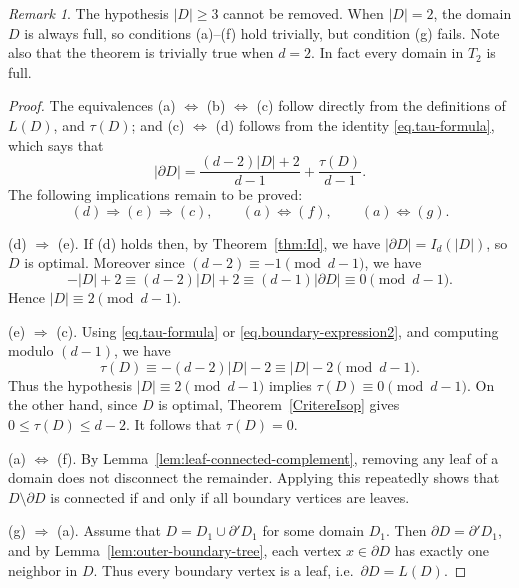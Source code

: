 \documentclass[a4paper, 11pt]{article}
\numberwithin{equation}{section}
\theoremstyle{definition}
\theoremstyle{remark}
\newtheorem{remark}[theorem]{Remark}
\begin{document}
\begin{remark}
The hypothesis $|D|\ge 3$ cannot be removed.  
When $|D|=2$, the domain $D$ is always full, so conditions (a)--(f) hold trivially, but condition (g) fails.
Note also that the theorem is trivially true when $d=2$. In fact every domain  in $T_2$ is full. 
\end{remark}

\medskip

\begin{proof} 
The equivalences (a) $\Leftrightarrow$ (b) $\Leftrightarrow$ (c) follow directly from the definitions of $L(D)$, and $\tau(D)$; and 
(c)  $\Leftrightarrow$ (d) follows from the identity \eqref{eq.tau-formula}, which says that 
\begin{equation}\label{eq.boundary-expression2}
    |\partial D| = \frac{(d-2)|D|+2}{d-1} + \frac{\tau(D)}{d-1}.
\end{equation}
The following implications remain to be proved:
$$
 (d)   \Rightarrow  (e)  \Rightarrow  (c),   \qquad    (a) \Leftrightarrow  (f) ,      \qquad      (a)\Leftrightarrow  (g).
$$

\smallskip

(d) $\Rightarrow$ (e).  
If (d) holds then, by Theorem~\ref{thm:Id}, we have $|\partial D| = I_d(|D|)$, so $D$ is optimal.  
Moreover  since  $(d-2)\equiv -1 \pmod{d-1}$, we have
$$
   -|D|+2 \equiv (d-2)|D|+2 \equiv (d-1) |\partial D|  \equiv 0 \pmod{d-1}.
$$
Hence $|D| \equiv 2 \pmod{d-1}$.


\smallskip

(e) $\Rightarrow$ (c).  
Using \eqref{eq.tau-formula} or \eqref{eq.boundary-expression2}, and computing modulo $(d-1)$, we have
\[
\tau(D)\equiv -(d-2)|D|-2 \equiv |D|-2 \pmod{d-1}.
\]
Thus the hypothesis $|D| \equiv 2 \pmod{d-1}$ implies $\tau(D)\equiv 0\pmod{d-1}$.  On the other hand, since $D$  is optimal, Theorem~\ref{CritereIsop} gives $0\le \tau(D)\le d-2$. It follows that $\tau(D)=0$.

\smallskip

(a) $\Leftrightarrow$ (f).  
By Lemma~\ref{lem:leaf-connected-complement}, removing any leaf of a domain does not disconnect the remainder.  
Applying this repeatedly shows that $D\setminus \partial D$ is connected if and only if  all boundary vertices are leaves.


\smallskip

(g) $\Rightarrow$ (a).
Assume that $D = D_1 \cup \partial' D_1$ for some domain $D_1$.
Then $\partial D = \partial' D_1$, and by Lemma~\ref{lem:outer-boundary-tree},
each vertex $x\in\partial D$ has exactly one neighbor in $D$.
Thus every boundary vertex is a leaf, i.e.\ $\partial D = L(D)$.



\end{proof}
\end{document}
